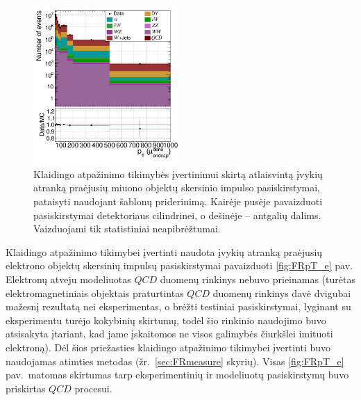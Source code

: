 \documentclass[a4paper, 12pt, oneside]{article}
\newcommand{\QCD}{QC\! D}
\begin{document}
\begin{figure}[t!]
	\includegraphics[width=0.49\textwidth]{Magistrinis/pT_mu_endcap_FIT.png}
	\caption{\label{fig:FRpT_muTFIT}
		Klaidingo atpažinimo tikimybės įvertinimui skirtą atlaisvintą įvykių atranką praėjusių miuono objektų skersinio
		impulso pasiskirstymai, pataisyti naudojant šablonų priderinimą.
		Kairėje pusėje pavaizduoti pasiskirstymai detektoriaus cilindrinei, o dešinėje -- antgalių dalims.
		Vaizduojami tik statistiniai neapibrėžtumai.}
\end{figure}

Klaidingo atpažinimo tikimybei įvertinti naudota įvykių atranką praėjusių elektrono objektų skersinių impulsų pasiskirstymai
pavaizduoti \ref{fig:FRpT_e} pav.
Elektronų atveju modeliuotas $\QCD$ duomenų rinkinys nebuvo prieinamas (turėtas elektromagnetiniais objektais praturtintas
$\QCD$ duomenų rinkinys davė dvigubai mažesnį rezultatą nei eksperimentas, o brėžti testiniai pasiskirstymai, lyginant su
eksperimentu turėjo kokybinių skirtumų, todėl šio rinkinio naudojimo buvo atsisakyta įtariant, kad jame įskaitomos ne visos
galimybės čiurkšlei imituoti elektroną).
Dėl šios priežasties klaidingo atpažinimo tikimybei įvertinti buvo naudojamas atimties metodas (žr.\ \ref{sec:FRmeasure} skyrių).
Visas \ref{fig:FRpT_e} pav.\ matomas skirtumas tarp eksperimentinių ir modeliuotų pasiskirstymų buvo priskirtas $\QCD$ procesui.
\end{document}
